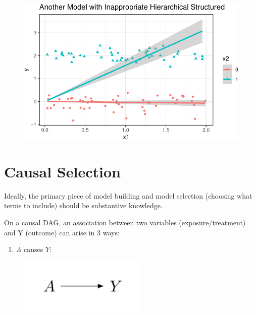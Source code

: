 \documentclass[
  letterpaper,
  DIV=11,
  numbers=noendperiod]{scrreport}
\providecommand{\tightlist}{%
  \setlength{\itemsep}{0pt}\setlength{\parskip}{0pt}}\usepackage{longtable,booktabs,array}
\begin{document}
\begin{figure}[H]

{\centering \includegraphics{week5/week5_files/figure-pdf/unnamed-chunk-1-2.pdf}

}

\end{figure}

\hypertarget{causal-selection}{%
\section{Causal Selection}\label{causal-selection}}

Ideally, the primary piece of model building and model selection
(choosing what terms to include) should be substantive knowledge.

On a causal DAG, an association between two variables
(exposure/treatment) and Y (outcome) can arise in 3 ways:

\begin{enumerate}
\def\labelenumi{\arabic{enumi}.}
\tightlist
\item
  \(A\) causes \(Y\):
\end{enumerate}

\begin{figure}

{\centering \includegraphics[width=0.55\textwidth,height=\textheight]{week5/standalone_figures/direct/direct.svg}

}

\end{figure}
\end{document}
